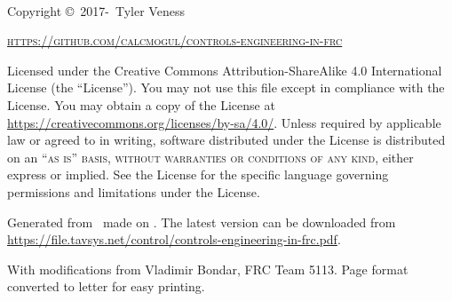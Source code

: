 ~\vfill
\thispagestyle{empty}

Copyright \copyright\ 2017-\unskip~Tyler Veness

\textsc{\url{https://github.com/calcmogul/controls-engineering-in-frc}}

Licensed under the Creative Commons Attribution-ShareAlike 4.0 International
License (the ``License''). You may not use this file except in compliance with
the License. You may obtain a copy of the License at
\url{https://creativecommons.org/licenses/by-sa/4.0/}. Unless required by
applicable law or agreed to in writing, software distributed under the License
is distributed on an \textsc{``as is'' basis, without warranties or conditions
of any kind}, either express or implied. See the License for the specific
language governing permissions and limitations under the License.

Generated from \unskip~made on
\unskip. The latest version can be downloaded from
\url{https://file.tavsys.net/control/controls-engineering-in-frc.pdf}.

With modifications from Vladimir Bondar, FRC Team 5113. Page format
converted to letter for easy printing.